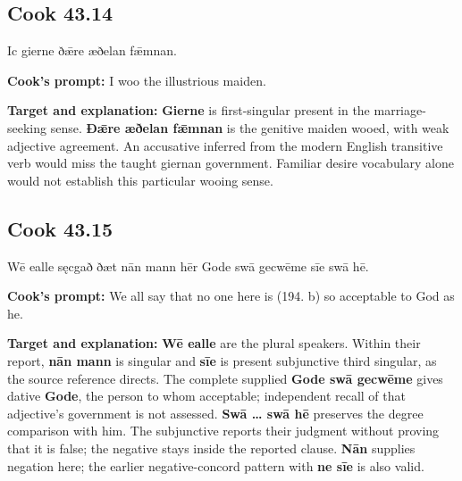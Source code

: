 \par\begin{minipage}{\linewidth}\raggedright
\subsection*{Cook 43.14}

Ic gierne ðǣre æðelan fǣmnan.

\textbf{Cook's prompt:} I woo the illustrious maiden.

\textbf{Target and explanation:} \textbf{Gierne} is first-singular present in the marriage-seeking sense. \textbf{Ðǣre æðelan fǣmnan} is the genitive maiden wooed, with weak adjective agreement. An accusative inferred from the modern English transitive verb would miss the taught giernan government. Familiar desire vocabulary alone would not establish this particular wooing sense.

\end{minipage}\par\addvspace{4pt}

\par\begin{minipage}{\linewidth}\raggedright
\subsection*{Cook 43.15}

Wē ealle sęcgað ðæt nān mann hēr Gode swā gecwēme sīe swā hē.

\textbf{Cook's prompt:} We all say that no one here is (194. b) so acceptable to God as he.

\textbf{Target and explanation:} \textbf{Wē ealle} are the plural speakers. Within their report, \textbf{nān mann} is singular and \textbf{sīe} is present subjunctive third singular, as the source reference directs. The complete supplied \textbf{Gode swā gecwēme} gives dative \textbf{Gode}, the person to whom acceptable; independent recall of that adjective's government is not assessed. \textbf{Swā … swā hē} preserves the degree comparison with him. The subjunctive reports their judgment without proving that it is false; the negative stays inside the reported clause. \textbf{Nān} supplies negation here; the earlier negative-concord pattern with \textbf{ne sīe} is also valid.

\end{minipage}\par\addvspace{4pt}

